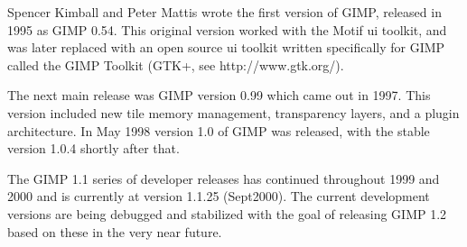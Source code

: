 Spencer Kimball and Peter Mattis wrote the first version of GIMP, released in
1995 as GIMP 0.54. This original version worked with the Motif ui toolkit, and
was later replaced with an open source ui toolkit written specifically for GIMP
called the GIMP Toolkit (GTK+, see http://www.gtk.org/).

The next main release was GIMP version 0.99 which came out in 1997. This
version included new tile memory management, transparency layers, and a plugin
architecture. In May 1998 version 1.0 of GIMP was released, with the stable
version 1.0.4 shortly after that.

The GIMP 1.1 series of developer releases has continued throughout 1999 and
2000 and is currently at version 1.1.25 (Sept2000). The current development
versions are being debugged and stabilized with the goal of releasing GIMP 1.2
based on these in the very near future.
